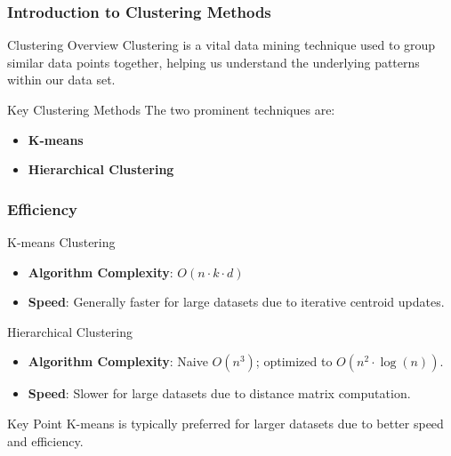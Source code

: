 \documentclass[aspectratio=169]{beamer}
\begin{document}
\begin{frame}[fragile]
    \frametitle{Introduction to Clustering Methods}
    \begin{block}{Clustering Overview}
        Clustering is a vital data mining technique used to group similar data points together, helping us understand the underlying patterns within our data set.
    \end{block}
    \begin{block}{Key Clustering Methods}
        The two prominent techniques are:
        \begin{itemize}
            \item \textbf{K-means}
            \item \textbf{Hierarchical Clustering}
        \end{itemize}
    \end{block}
\end{frame}

\begin{frame}[fragile]
    \frametitle{Efficiency}
    \begin{block}{K-means Clustering}
        \begin{itemize}
            \item \textbf{Algorithm Complexity}: \(O(n \cdot k \cdot d)\)
            \item \textbf{Speed}: Generally faster for large datasets due to iterative centroid updates.
        \end{itemize}
    \end{block}
    \begin{block}{Hierarchical Clustering}
        \begin{itemize}
            \item \textbf{Algorithm Complexity}: Naive \(O(n^3)\); optimized to \(O(n^2 \cdot \log(n))\).
            \item \textbf{Speed}: Slower for large datasets due to distance matrix computation.
        \end{itemize}
    \end{block}
    \begin{block}{Key Point}
        K-means is typically preferred for larger datasets due to better speed and efficiency.
    \end{block}
\end{frame}
\end{document}
